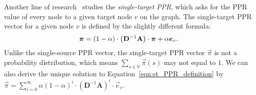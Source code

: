 Another line of research~\cite{lofgren2013personalized,wang2020RBS} studies the {\em single-target PPR}, which asks for the PPR value of every node to a given target node $v$ on the graph.  The single-target PPR vector for a given node $v$ is defined by the slightly different formula: %
\vspace{-2mm}
\begin{equation}\label{eqn:st_PPR_definition}
\vspace{-2mm}
 	\begin{aligned}
 		\vec{\pi} =\left( 1-\alpha \right) \cdot \left(\mathbf{D}^{-1} \mathbf{A} \right)\cdot \vec{\pi}+\alpha \vec{e}_v.  
	\end{aligned}
 \end{equation}
Unlike the single-source PPR vector, the single-target PPR vector $\vec{\pi}$ is not a probability distribution, which means $\sum_{s\in V}\vec{\pi}(s)$ may not equal to $1$. 
We can also derive the unique solution to Equation~\eqref{eqn:st_PPR_definition} by $\vec{\pi} =\sum_{i=0}^\infty \alpha \left( 1-\alpha \right)^i \cdot \left(\mathbf{D}^{-1}\mathbf{A} \right)^i \cdot \vec{e}_v$.

